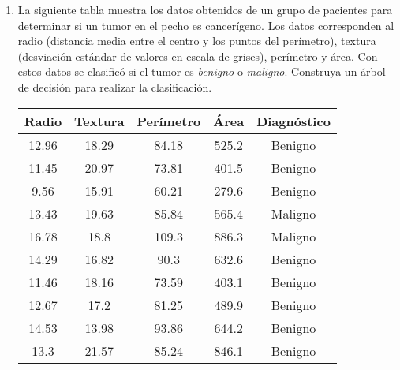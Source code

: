 \documentclass[
10pt, %
a4paper, %
]{article}
\begin{document}
\begin{enumerate}
    \item La siguiente tabla muestra los datos obtenidos de un grupo de pacientes para determinar si un tumor en el pecho es 
	cancerígeno. Los datos corresponden al radio (distancia media entre el centro y los puntos del perímetro), textura 
	(desviación estándar de valores en escala de grises), perímetro y área. Con estos datos se clasificó si el tumor 
	es \textit{benigno} o \textit{maligno}. Construya un árbol de decisión para realizar la clasificación.
	\begin{table}[h]
		\centering
		\begin{tabular}{ccccc}
			\toprule
			Radio & Textura & Perímetro & Área & Diagnóstico \\ \midrule
			12.96 & 18.29 & 84.18 & 525.2 & Benigno \\
			11.45 & 20.97 & 73.81 & 401.5 & Benigno \\
			9.56  & 15.91 & 60.21 & 279.6 & Benigno \\
			13.43 & 19.63 & 85.84 & 565.4 & Maligno \\
			16.78 & 18.8  & 109.3 & 886.3 & Maligno \\
			14.29 & 16.82 & 90.3  & 632.6 & Benigno \\
			11.46 & 18.16 & 73.59 & 403.1 & Benigno \\
			12.67 & 17.2  & 81.25 & 489.9 & Benigno \\
			14.53 & 13.98 & 93.86 & 644.2 & Benigno \\
			13.3  & 21.57 & 85.24 & 846.1 & Benigno \\
			\bottomrule
		\end{tabular}
	\end{table}


\end{enumerate}
\end{document}
